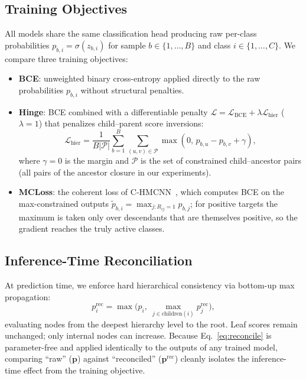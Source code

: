 \documentclass[conference]{IEEEtran}
\begin{document}
\subsection{Training Objectives}
All models share the same classification head producing raw per-class
probabilities $p_{b,i} = \sigma(z_{b,i})$ for sample $b \in \{1,\dots,B\}$ and
class $i \in \{1,\dots,C\}$. We compare three training objectives:
\begin{itemize}
  \item \textbf{BCE}: unweighted binary cross-entropy applied directly
  to the raw probabilities $p_{b,i}$ without structural penalties.
  \item \textbf{Hinge}: BCE combined with a differentiable penalty
  $\mathcal{L} = \mathcal{L}_{\text{BCE}} + \lambda\mathcal{L}_{\text{hier}}$
  ($\lambda=1$) that penalizes child--parent score inversions:
  \begin{equation}
  \mathcal{L}_{\text{hier}} = \frac{1}{B|\mathcal{P}|}\sum_{b=1}^{B}\sum_{(u,v)\in\mathcal{P}}
  \max(0,\,p_{b,u}-p_{b,v}+\gamma),
  \label{eq:hinge}
  \end{equation}
  where $\gamma=0$ is the margin and $\mathcal{P}$ is the set of constrained
  child--ancestor pairs (all pairs of the ancestor closure in our experiments).
  \item \textbf{MCLoss}: the coherent loss of C-HMCNN~\cite{chmcnn}, which
  computes BCE on the max-constrained outputs $\tilde{p}_{b,i} = \max_{j:
  R_{ij}=1} p_{b,j}$; for positive targets the maximum is taken only over
  descendants that are themselves positive, so the gradient reaches the truly
  active classes.
\end{itemize}

\subsection{Inference-Time Reconciliation}
At prediction time, we enforce hard hierarchical consistency via bottom-up max
propagation:
\begin{equation}
p_i^{\text{rec}} = \max\Big(p_i,\ \max_{j\in\text{children}(i)} p_j^{\text{rec}}\Big),
\label{eq:reconcile}
\end{equation}
evaluating nodes from the deepest hierarchy level to the root. Leaf scores
remain unchanged; only internal nodes can increase. Because Eq.~\eqref{eq:reconcile}
is parameter-free and applied identically to the outputs of any trained model,
comparing ``raw'' ($\mathbf{p}$) against ``reconciled'' ($\mathbf{p}^{\text{rec}}$)
cleanly isolates the inference-time effect from the training objective.
\end{document}
